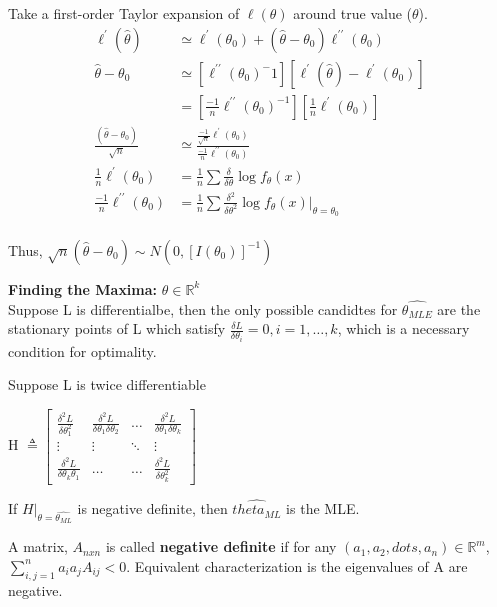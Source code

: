 \documentclass[11pt,fleqn]{book} %
\begin{document}
Take a first-order Taylor expansion of $\ell(\theta)$ around true value ($\theta$). 
\begin{align*}
\ell^\prime(\hat{\theta})&\simeq \ell^\prime(\theta_0) + (\hat{\theta}-\theta_0)\ell^{\prime\prime}(\theta_0)\\
\hat{\theta}-\theta_0&\simeq [\ell^{\prime\prime}(\theta_0)^-1][\ell^\prime(\hat{\theta})-\ell^\prime(\theta_0)]\\
	&=[\frac{-1}{n}\ell^{\prime\prime}(\theta_0)^{-1}][\frac{1}{n}\ell^\prime(\theta_0)]\\
\frac{(\hat{\theta}-\theta_0)}{\sqrt{n}}&\simeq \frac{\frac{-1}{\sqrt{n}}\ell^\prime(\theta_0)}{\frac{-1}{n}\ell^{\prime\prime}(\theta_0)}\\
\frac{1}{n}\ell^\prime(\theta_0)&= \frac{1}{n}\sum \frac{\delta}{\delta\theta}\log f_\theta(x)\\
\frac{-1}{n}\ell^{\prime\prime}(\theta_0)&= \frac{1}{n}\sum \frac{\delta^2}{\delta\theta^2}\log f_\theta(x)|_{\theta=\theta_0}\\
\end{align*}

Thus, $\sqrt{n}(\hat{\theta}-\theta_0)\sim N(0,[I(\theta_0)]^{-1})$

\textbf{Finding the Maxima:} $\theta \in \mathbb{R}^k$\\
Suppose L is differentialbe, then the only possible candidtes for $\hat{\theta_{MLE}}$ are the stationary points of L which satisfy $\frac{\delta L}{\delta \theta_i} = 0, i=1, \dots, k$, which is a necessary condition for optimality.

Suppose L is twice differentiable 

\begin{center}
H $\triangleq \begin{bmatrix}
    \frac{\delta^2 L}{\delta \theta_1^2} & \frac{\delta^2 L}{\delta \theta_1 \delta \theta_2} & \dots & \frac{\delta^2 L}{\delta \theta_1 \delta \theta_k} \\
    \vdots & \vdots & \ddots & \vdots \\
        \frac{\delta^2 L}{\delta \theta_k \theta_1} & \dots & \dots & \frac{\delta^2 L}{\delta \theta_k^2}

\end{bmatrix}$	
\end{center}

If $H|_{\theta = \hat{\theta_{ML}}}$ is negative definite, then $\hat{theta_{ML}}$ is the MLE. 

\begin{definition}
	A matrix, $A_{nxn}$ is called \textbf{negative definite} if for any $(a_1, a_2, dots, a_n) \in \mathbb{R}^m$, $\sum\limits^n_{i,j = 1} a_i a_j A_{ij} < 0$. Equivalent characterization is the eigenvalues of A are negative.
\end{definition}
\end{document}
